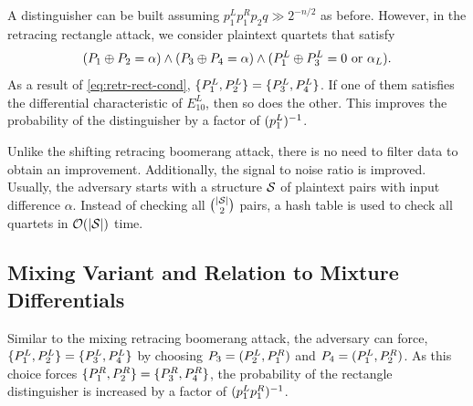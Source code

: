 \documentclass[twoside]{article}
\begin{document}
A distinguisher can be built assuming \(p_1^Lp_1^Rp_2q \gg 2^{-n/2}\) as before.
However, in the retracing rectangle attack, we consider plaintext quartets that
satisfy
\begin{equation}
    (P_1 \oplus P_2 = \alpha) \land (P_3 \oplus P_4 = \alpha) \land (P_1^L \oplus P_3^L = 0 \textrm{ or } \alpha_L).
    \label{eq:retr-rect-cond}
\end{equation}
As a result of \eqref{eq:retr-rect-cond}, \(\{P_1^L, P_2^L\} = \{P_3^L,
P_4^L\}\). If one of them satisfies the differential characteristic of
\(E_{10}^L\), then so does the other. This improves the probability of the
distinguisher by a factor of \((p_1^L)^{-1}\).

Unlike the shifting retracing boomerang attack, there is no need to filter data
to obtain an improvement. Additionally, the signal to noise ratio is improved.
Usually, the adversary starts with a structure \(\mathcal S\) of plaintext pairs with
input difference \(\alpha\). Instead of checking all \(\binom{\left\vert\mathcal S\right\vert}{2}\)
pairs, a hash table is used to check all quartets in \(\mathcal O(\left\vert\mathcal S\right\vert)\)
time.

\subsection{Mixing Variant and Relation to Mixture Differentials}

Similar to the mixing retracing boomerang attack, the adversary can force,
\(\{P_1^L, P_2^L\} = \{P_3^L, P_4^L\}\) by choosing \(P_3 = (P_2^L,
P_1^R)\) and \(P_4 = (P_1^L, P_2^R)\). As this choice forces
\(\{P_1^R, P_2^R\} = \{P_3^R, P_4^R\}\), the probability of the
rectangle distinguisher is increased by a factor of \((p_1^Lp_1^R)^{-1}\).
\end{document}
